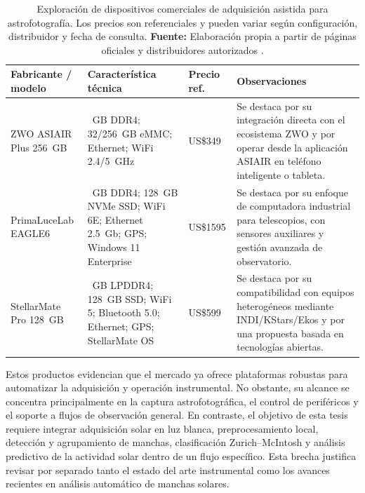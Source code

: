 \begin{table}[H]
\centering
\caption{Exploración de dispositivos comerciales de adquisición asistida para astrofotografía. Los precios son referenciales y pueden variar según configuración, distribuidor y fecha de consulta. \textbf{Fuente:} Elaboración propia a partir de páginas oficiales y distribuidores autorizados \citep{zwoASIAIR2026,bhASIairPlus2026,primaluceEagle62026,primaluceEagle6USA2026,stellarmatePro2026}.}
\label{tab:dispositivos-adquisicion-comerciales}
\uniformtablestyle
\begin{tabularx}{\textwidth}{>{\raggedright\arraybackslash}p{3.35cm} >{\raggedright\arraybackslash}p{3.15cm} >{\centering\arraybackslash}p{1.45cm} X}
\toprule
\textbf{Fabricante / modelo} & \textbf{Característica técnica} & \textbf{Precio ref.} & \textbf{Observaciones} \\
\midrule
ZWO ASIAIR Plus 256~GB & 4~GB DDR4; 32/256~GB eMMC; Ethernet; WiFi 2.4/5~GHz & US\$349 & Se destaca por su integración directa con el ecosistema ZWO y por operar desde la aplicación ASIAIR en teléfono inteligente o tableta. \\
PrimaLuceLab EAGLE6 & 8~GB DDR4; 128~GB NVMe SSD; WiFi 6E; Ethernet 2.5~Gb; GPS; Windows 11 Enterprise & US\$1595 & Se destaca por su enfoque de computadora industrial para telescopios, con sensores auxiliares y gestión avanzada de observatorio. \\
StellarMate Pro 128~GB & 8~GB LPDDR4; 128~GB SSD; WiFi 5; Bluetooth 5.0; Ethernet; GPS; StellarMate OS & US\$599 & Se destaca por su compatibilidad con equipos heterogéneos mediante INDI/KStars/Ekos y por una propuesta basada en tecnologías abiertas. \\
\bottomrule
\end{tabularx}
\end{table}

Estos productos evidencian que el mercado ya ofrece plataformas robustas para automatizar la adquisición y operación instrumental. No obstante, su alcance se concentra principalmente en la captura astrofotográfica, el control de periféricos y el soporte a flujos de observación general. En contraste, el objetivo de esta tesis requiere integrar adquisición solar en luz blanca, preprocesamiento local, detección y agrupamiento de manchas, clasificación Zurich--McIntosh y análisis predictivo de la actividad solar dentro de un flujo específico. Esta brecha justifica revisar por separado tanto el estado del arte instrumental como los avances recientes en análisis automático de manchas solares.

